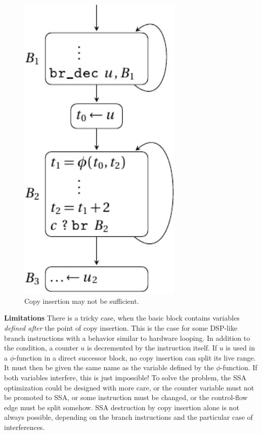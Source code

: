 \begin{figure}[t]
{\begin{minipage}{0.33\textwidth}
    \includegraphics[width=0.7\textwidth]{cexple-impossible-3.pdf}
  \end{minipage}
}
\caption{Copy insertion may not be sufficient.\label{fig:alternative_ssa_destruction:ex_jump_impossible}}
\end{figure}

{\bf Limitations}
There is a  tricky case, when the basic block contains variables
\emph{defined after} the point of copy insertion. This is the case for some
DSP-like branch instructions with a behavior similar to hardware looping. In
addition to the condition, a counter $u$ is decremented by the instruction
itself. If $u$ is used in a $\phi$-function in a direct successor block, no
copy insertion can split its live range. It must then be given the same name as
the variable defined by the $\phi$-function. If both variables interfere, this
is just impossible! To solve the problem, the SSA optimization could be
designed with more care, or the counter variable must not be promoted to SSA,
or some instruction must be changed, or the control-flow edge must be split
somehow.  SSA destruction by
copy insertion alone is not always possible, depending on the branch
instructions and the particular case of interferences.

